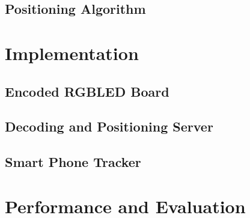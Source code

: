 \documentclass[conference]{IEEEtran}
\begin{document}
\subsection{Positioning Algorithm}

\section{Implementation}
\subsection{Encoded RGBLED Board}
\subsection{Decoding and Positioning Server}
\subsection{Smart Phone Tracker}

\section{Performance and Evaluation}
















\end{document}
